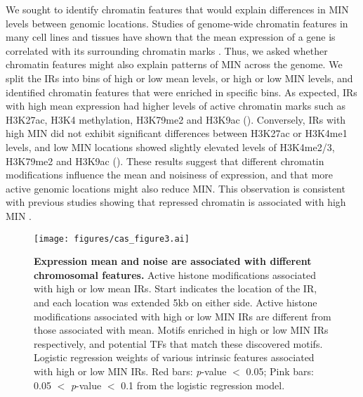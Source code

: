 We sought to identify chromatin features that would explain differences in MIN levels between genomic locations. Studies of genome-wide chromatin features in many cell lines and tissues have shown that the mean expression of a gene is correlated with its surrounding chromatin marks \cite{dunham2012n, akhtarw_vansteenselb:ChromatinPosition2013}. Thus, we asked whether chromatin features might also explain patterns of MIN across the genome. We split the IRs into bins of high or low mean levels, or high or low MIN levels, and identified chromatin features that were enriched in specific bins. As expected, IRs with high mean expression had higher levels of active chromatin marks such as H3K27ac, H3K4 methylation, H3K79me2 and H3K9ac (). Conversely, IRs with high MIN did not exhibit significant differences between H3K27ac or H3K4me1 levels, and low MIN locations showed slightly elevated levels of H3K4me2/3, H3K79me2 and H3K9ac (). These results suggest that different chromatin modifications influence the mean and noisiness of expression, and that more active genomic locations might also reduce MIN. This observation is consistent with previous studies showing that repressed chromatin is associated with high MIN \cite{faureaj_lehnerb:SystematicAnalysis2017,deyss_arkinap:OrthogonalControl2015}. 

\begin{figure}[tbp]  
    \centering
    \texttt{[image: figures/cas\_figure3.ai]}
    \caption[Chromosomal features associated with expression mean and noise.]{%
        \textbf{Expression mean and noise are associated with different chromosomal features.}
        Active histone modifications associated with high or low mean IRs. Start indicates the location of the IR, and each location was extended 5kb on either side.
        Active histone modifications associated with high or low MIN IRs are different from those associated with mean.
        Motifs enriched in high or low MIN IRs respectively, and potential TFs that match these discovered motifs.
        Logistic regression weights of various intrinsic features associated with high or low MIN IRs. Red bars: \textit{p}-value $<$ 0.05; Pink bars: 0.05 $<$ \textit{p}-value $<$ 0.1 from the logistic regression model.  
    }
    \label{fig:cas_figure3}
\end{figure}

